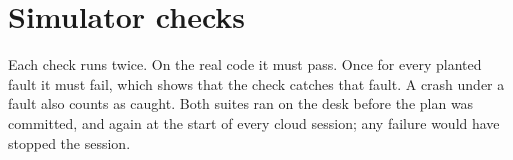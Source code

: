 \section{Simulator checks}\label{app:checks}
Each check runs twice. On the real code it must pass. Once for every planted fault it must fail, which shows that the check
catches that fault. A crash under a fault also counts as caught. Both suites ran on the desk before the plan was committed, and
again at the start of every cloud session; any failure would have stopped the session.


